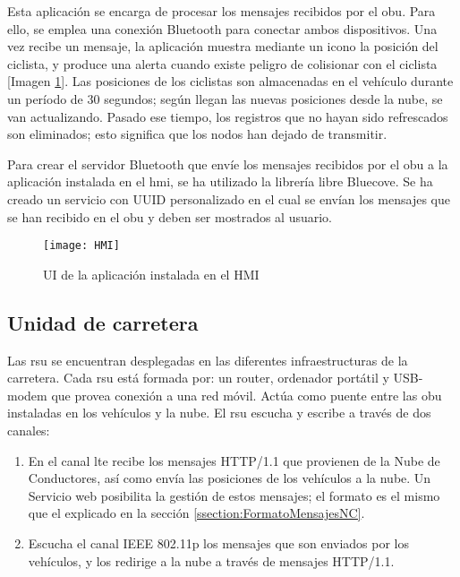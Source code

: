 Esta aplicación se encarga de procesar los mensajes recibidos por el \gls{obu}. Para ello, se emplea una conexión Bluetooth para conectar ambos dispositivos. Una vez recibe un mensaje, la aplicación muestra mediante un icono la posición del ciclista, y produce una alerta cuando existe peligro de colisionar con el ciclista [Imagen \ref{figure:HMI}]. Las posiciones de los ciclistas son almacenadas en el vehículo durante un período de 30 segundos; según llegan las nuevas posiciones desde la nube, se van actualizando. Pasado ese tiempo, los registros que no hayan sido refrescados son eliminados; esto significa que los nodos han dejado de transmitir.

Para crear el servidor Bluetooth que envíe los mensajes recibidos por el \gls{obu} a la aplicación instalada en el \gls{hmi}, se ha utilizado la librería libre Bluecove. Se ha creado un servicio con UUID personalizado en el cual se envían los mensajes que se han recibido en el \gls{obu} y deben ser mostrados al usuario.

\begin{figure}[H]
	\begin{center}
		\texttt{[image: HMI]}
		\caption{UI de la aplicación instalada en el HMI}
		\label{figure:HMI}
	\end{center}
\end{figure}

\subsection{Unidad de carretera}
Las \gls{rsu} se encuentran desplegadas en las diferentes infraestructuras de la carretera. Cada \gls{rsu} está formada por: un router, ordenador portátil y USB-modem que provea conexión a una red móvil. Actúa como puente entre las \gls{obu} instaladas en los vehículos y la nube. El \gls{rsu} escucha y escribe a través de dos canales:
\begin{enumerate}
	\item En el canal \gls{lte} recibe los mensajes HTTP/1.1 que provienen de la Nube de Conductores, así como envía las posiciones de los vehículos a la nube. Un Servicio web posibilita la gestión de estos mensajes; el formato es el mismo que el explicado en la sección \ref{ssection:FormatoMensajesNC}.
		
	\item Escucha el canal IEEE 802.11p los mensajes que son enviados por los vehículos, y los redirige a la nube a través de mensajes HTTP/1.1.
\end{enumerate}

